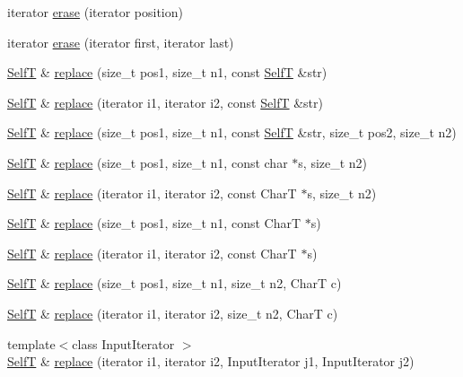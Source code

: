 \begin{CompactItemize}
iterator \hyperlink{classvector__string_26b9ec8489b4a06280b098fa272aaeab}{erase} (iterator position)
\item 
iterator \hyperlink{classvector__string_c18e5c85d57d5b27357119228d9639c6}{erase} (iterator first, iterator last)
\item 
\hyperlink{classvector__string}{SelfT} \& \hyperlink{classvector__string_9ee659752a1293cc78baf7212aa25ed8}{replace} (size\_\-t pos1, size\_\-t n1, const \hyperlink{classvector__string}{SelfT} \&str)
\item 
\hyperlink{classvector__string}{SelfT} \& \hyperlink{classvector__string_f5d63c2c0b023d1719ef9cd0a94e4e7d}{replace} (iterator i1, iterator i2, const \hyperlink{classvector__string}{SelfT} \&str)
\item 
\hyperlink{classvector__string}{SelfT} \& \hyperlink{classvector__string_7721190d3b203c2debdde8decc8b4805}{replace} (size\_\-t pos1, size\_\-t n1, const \hyperlink{classvector__string}{SelfT} \&str, size\_\-t pos2, size\_\-t n2)
\item 
\hyperlink{classvector__string}{SelfT} \& \hyperlink{classvector__string_75a0a425571b008d49608cbaeaa009bd}{replace} (size\_\-t pos1, size\_\-t n1, const char $\ast$s, size\_\-t n2)
\item 
\hyperlink{classvector__string}{SelfT} \& \hyperlink{classvector__string_02f74c9a49dca62cf406f8d4333b5b26}{replace} (iterator i1, iterator i2, const CharT $\ast$s, size\_\-t n2)
\item 
\hyperlink{classvector__string}{SelfT} \& \hyperlink{classvector__string_37ba405b4c07993127d537b60885a57a}{replace} (size\_\-t pos1, size\_\-t n1, const CharT $\ast$s)
\item 
\hyperlink{classvector__string}{SelfT} \& \hyperlink{classvector__string_17c5332dcb5ab7354aaef88da5238f88}{replace} (iterator i1, iterator i2, const CharT $\ast$s)
\item 
\hyperlink{classvector__string}{SelfT} \& \hyperlink{classvector__string_00e7aaca1b2d5d06fbf58889de59b417}{replace} (size\_\-t pos1, size\_\-t n1, size\_\-t n2, CharT c)
\item 
\hyperlink{classvector__string}{SelfT} \& \hyperlink{classvector__string_001d31babf69110da340488c9f37aec2}{replace} (iterator i1, iterator i2, size\_\-t n2, CharT c)
\item 
{\footnotesize template$<$class InputIterator $>$ }\\\hyperlink{classvector__string}{SelfT} \& \hyperlink{classvector__string_081f3ca5b6aa4391a5dc2316f2647073}{replace} (iterator i1, iterator i2, InputIterator j1, InputIterator j2)

\end{CompactItemize}
